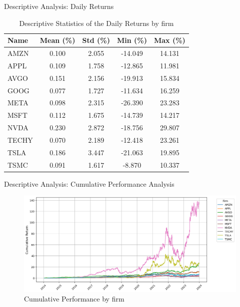 \documentclass{beamer}
\begin{document}
\begin{frame}{Descriptive Analysis: Daily Returns}
  
\begin{table}[ht]
    \centering
    \begin{tabular}{lcccc}
        \toprule
        \textbf{Name} & \textbf{Mean (\%)} & \textbf{Std (\%)} & \textbf{Min (\%)} & \textbf{Max (\%)} \\
        \midrule
        AMZN  & 0.100 & 2.055 & -14.049 & 14.131 \\
        APPL  & 0.109 & 1.758 & -12.865 & 11.981 \\
        AVGO  & 0.151 & 2.156 & -19.913 & 15.834 \\
        GOOG  & 0.077 & 1.727 & -11.634 & 16.259 \\
        META  & 0.098 & 2.315 & -26.390 & 23.283 \\
        MSFT  & 0.112 & 1.675 & -14.739 & 14.217 \\
        NVDA  & 0.230 & 2.872 & -18.756 & 29.807 \\
        TECHY & 0.070 & 2.189 & -12.418 & 23.261 \\
        TSLA  & 0.186 & 3.447 & -21.063 & 19.895 \\
        TSMC  & 0.091 & 1.617 & -8.870  & 10.337 \\
        \bottomrule
    \end{tabular}
    \caption{Descriptive Statistics of the Daily Returns  by firm}
    \label{tab:returns_stats}
\end{table}
    
\end{frame}

\begin{frame}{Descriptive Analysis: Cumulative Performance Analysis}
  
\begin{figure}
    \centering
    \includegraphics[width=0.9\linewidth]{../images/cum_perf_analysis.png}
    \caption{Cumulative Performance by firm}
    \label{fig:cum_perf}
\end{figure}
    
\end{frame}
\end{document}
